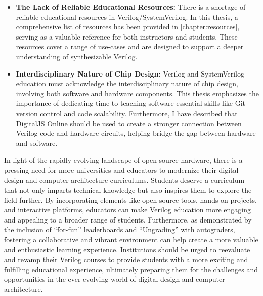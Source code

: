 \begin{itemize}
    \item \textbf{The Lack of Reliable Educational Resources:}
        There is a shortage of reliable educational resources in Verilog/SystemVerilog.
        In this thesis, a comprehensive list of resources has been provided in \autoref{chapter:resources}, serving as a valuable reference for both instructors and students.
        These resources cover a range of use-cases and are designed to support a deeper understanding of synthesizable Verilog.
    \item \textbf{Interdisciplinary Nature of Chip Design:}
        Verilog and SystemVerilog education must acknowledge the interdisciplinary nature of chip design, involving both software and hardware components.
        This thesis emphasizes the importance of dedicating time to teaching software essential skills like Git version control and code scalability.
        Furthermore, I have described that DigitalJS Online should be used to create a stronger connection between Verilog code and hardware circuits, helping bridge the gap between hardware and software.
\end{itemize}

In light of the rapidly evolving landscape of open-source hardware, there is a pressing need for more universities and educators to modernize their digital design and computer architecture curriculums.
Students deserve a curriculum that not only imparts technical knowledge but also inspires them to explore the field further.
By incorporating elements like open-source tools, hands-on projects, and interactive platforms, educators can make Verilog education more engaging and appealing to a broader range of students.
Furthermore, as demonstrated by the inclusion of \enquote{for-fun} leaderboards and \enquote{Ungrading} with autograders, fostering a collaborative and vibrant environment can help create a more valuable and enthusiastic learning experience.
Institutions should be urged to reevaluate and revamp their Verilog courses to provide students with a more exciting and fulfilling educational experience, ultimately preparing them for the challenges and opportunities in the ever-evolving world of digital design and computer architecture.
